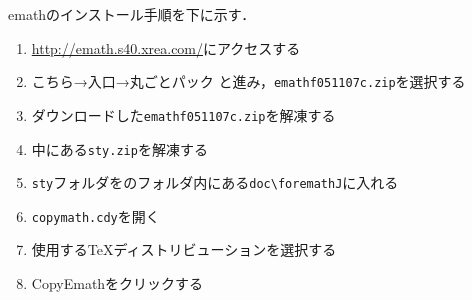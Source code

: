 emathのインストール手順を下に示す．
\begin{enumerate}
    \item \url{http://emath.s40.xrea.com/}にアクセスする
    \item こちら→入口→丸ごとパック と進み，\verb|emathf051107c.zip|を選択する
    \item ダウンロードした\verb|emathf051107c.zip|を解凍する
    \item 中にある\verb|sty.zip|を解凍する
    \item \verb|sty|フォルダを{\ketcindy}のフォルダ内にある\verb|doc\foremathJ|に入れる
    \item \verb|copymath.cdy|を開く
    \item 使用する{\TeX}ディストリビューションを選択する
    \item CopyEmathをクリックする
\end{enumerate}

